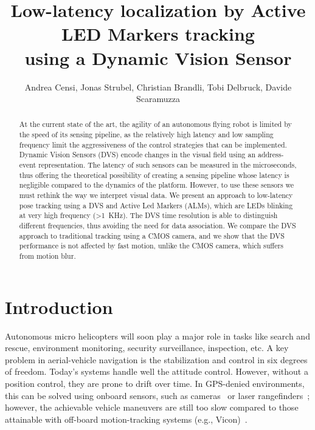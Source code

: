 
\title{\LARGE\bf Low-latency localization by Active LED Markers tracking
\\
using a Dynamic Vision Sensor}


\author{Andrea Censi\mythanks, Jonas Strubel, Christian Brandli, Tobi Delbruck,
Davide Scaramuzza}
\maketitle
\begin{abstract}
At the current state of the art, the agility of an autonomous flying
robot is limited by the speed of its sensing pipeline, as the relatively
high latency and low sampling frequency limit the aggressiveness of
the control strategies that can be implemented. Dynamic Vision Sensors
(DVS) encode changes in the visual field using an address-event representation.
The latency of such sensors can be measured in the microseconds, thus
offering the theoretical possibility of creating a sensing pipeline
whose latency is negligible compared to the dynamics of the platform.
However, to use these sensors we must rethink the way we interpret
visual data. We present an approach to low-latency pose tracking using
a DVS and Active Led Markers (ALMs), which are LEDs blinking at very
high frequency (>1~KHz). The DVS time resolution is able to distinguish
different frequencies, thus avoiding the need for data association.
We compare the DVS approach to traditional tracking using a CMOS camera,
and we show that the DVS performance is not affected by fast motion,
unlike the CMOS camera, which suffers from motion blur. 
\end{abstract}

\section{Introduction}

Autonomous micro helicopters will soon play a major role in tasks
like search and rescue, environment monitoring, security surveillance,
inspection, etc. A key problem in aerial-vehicle navigation is the
stabilization and control in six degrees of freedom. Today's systems
handle well the attitude control. However, without a position control,
they are prone to drift over time. In GPS-denied environments, this
can be solved using onboard sensors, such as cameras~\cite{Weiss2011}
or laser rangefinders~\cite{Shen2011}; however, the achievable vehicle
maneuvers are still too slow compared to those attainable with off-board
motion-tracking systems (e.g., Vicon)~\cite{Lupashin2012}.

